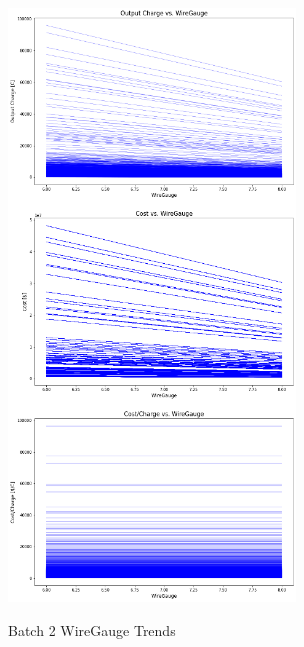 \begin{figure}
    \begin{center}
    \includegraphics[width=3in]{fig22.png}
    \end{center}
    \renewcommand{\baselinestretch}{1}
    \small\normalsize
    \begin{quote}
    \caption[Batch 2 WireGauge Trends]{Batch 2 WireGauge Trends} \label{fig: f22}
    \end{quote}
\end{figure}


